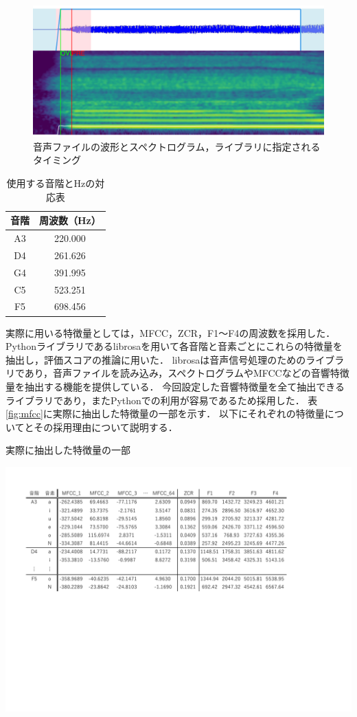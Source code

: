 \begin{figure}[htb]
  \centering
  \includegraphics[width=0.9\linewidth]{fig/eve_a.png}
  \caption{音声ファイルの波形とスペクトログラム，ライブラリに指定されるタイミング}
  \label{tab:waveform}
\end{figure}

\begin{table}[htb]
  \centering
  \caption{使用する音階とHzの対応表}
  \label{tab:hz}
  \begin{tabular}{c|c}
    \hline
    音階 & 周波数（Hz） \\
    \hline
    A3 & 220.000 \\
    D4 & 261.626 \\
    G4 & 391.995 \\
    C5 & 523.251 \\
    F5 & 698.456 \\
    \hline
  \end{tabular}
\end{table}

実際に用いる特徴量としては，MFCC，ZCR，F1〜F4の周波数を採用した．
Pythonライブラリであるlibrosaを用いて各音階と音素ごとにこれらの特徴量を抽出し，評価スコアの推論に用いた．
librosaは音声信号処理のためのライブラリであり，音声ファイルを読み込み，スペクトログラムやMFCCなどの音響特徴量を抽出する機能を提供している．
今回設定した音響特徴量を全て抽出できるライブラリであり，またPythonでの利用が容易であるため採用した．
表\ref{fig:mfcc}に実際に抽出した特徴量の一部を示す．
以下にそれぞれの特徴量についてとその採用理由について説明する．

\begin{table}[htb]
  \centering
  \caption{実際に抽出した特徴量の一部}
  \label{fig:mfcc}
  \includegraphics[width=0.9\linewidth]{fig/features_sample_ama.pdf}
\end{table}

